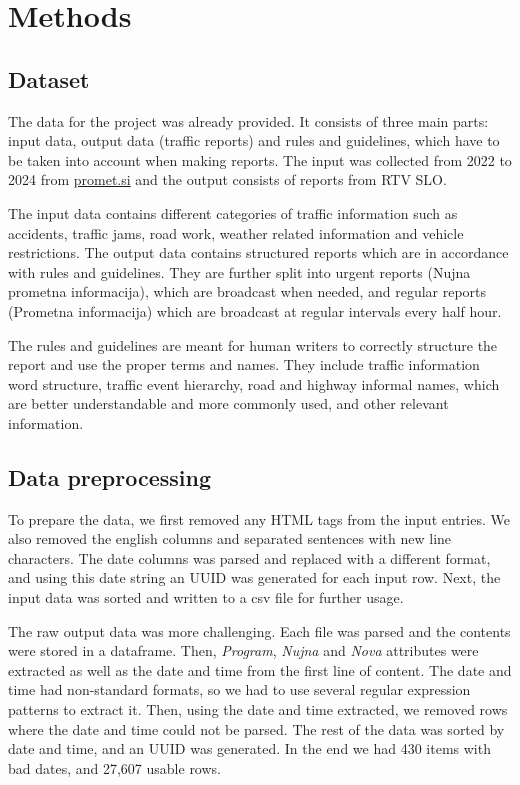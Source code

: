 \documentclass[fleqn,moreauthors,10pt]{ds_report}
\begin{document}

\section*{Methods}

\subsection*{Dataset}
The data for the project was already provided. It consists of three main parts: input data, output data (traffic reports) and rules and guidelines, which have to be taken into account when making reports. The input was collected from 2022 to 2024 from \url{promet.si} and the output consists of reports from RTV SLO. 

The input data contains different categories of traffic information such as accidents, traffic jams, road work, weather related information and vehicle restrictions.
The output data contains structured reports which are in accordance with rules and guidelines. They are further split into urgent reports (Nujna prometna informacija), which are broadcast when needed, and regular reports (Prometna informacija) which are broadcast at regular intervals every half hour.

The rules and guidelines are meant for human writers to correctly structure the report and use the proper terms and names. They include traffic information word structure, traffic event hierarchy, road and highway informal names, which are better understandable and more commonly used, and other relevant information.


\subsection*{Data preprocessing}
To prepare the data, we first removed any HTML tags from the input entries.  We also removed the english columns and separated sentences with new line characters. The date columns was parsed and replaced with a different format, and using this date string an UUID was generated for each input row. Next, the input data was sorted and written to a csv file for further usage.

The raw output data was more challenging. Each file was parsed and the contents were stored in a dataframe. Then, \textit{Program}, \textit{Nujna} and \textit{Nova} attributes were extracted as well as the date and time from the first line of content. The date and time had non-standard formats, so we had to use several regular expression patterns to extract it. Then, using the date and time extracted, we removed rows where the date and time could not be parsed. The rest of the data was sorted by date and time, and an UUID was generated.
In the end we had 430 items with bad dates, and 27,607 usable rows.
\end{document}
